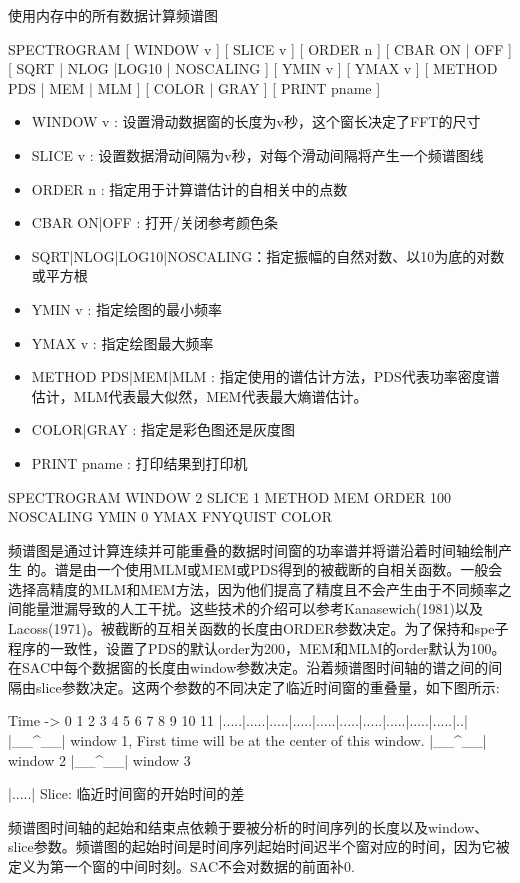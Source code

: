 \label{cmd:spectrogram}

使用内存中的所有数据计算频谱图

SPECTROGRAM [ WINDOW v ] [ SLICE v ] [ ORDER n ] [ CBAR ON | OFF ] [ SQRT | NLOG |LOG10 | NOSCALING ] [ YMIN v ] [ YMAX v ] [ METHOD PDS | MEM | MLM ] [
COLOR | GRAY ] [ PRINT pname ]

\begin{itemize}
\item WINDOW v : 设置滑动数据窗的长度为v秒，这个窗长决定了FFT的尺寸 
\item SLICE v : 设置数据滑动间隔为v秒，对每个滑动间隔将产生一个频谱图线 
\item ORDER n : 指定用于计算谱估计的自相关中的点数 
\item CBAR ON|OFF : 打开/关闭参考颜色条 
\item SQRT|NLOG|LOG10|NOSCALING：指定振幅的自然对数、以10为底的对数或平方根
\item YMIN v : 指定绘图的最小频率  
\item YMAX v : 指定绘图最大频率 
\item METHOD PDS|MEM|MLM : 指定使用的谱估计方法，PDS代表功率密度谱估计，MLM代表最大似然，MEM代表最大熵谱估计。  
\item COLOR|GRAY : 指定是彩色图还是灰度图 
\item PRINT pname : 打印结果到打印机  
\end{itemize}

SPECTROGRAM WINDOW 2 SLICE 1 METHOD MEM ORDER 100 NOSCALING 	YMIN 0 YMAX FNYQUIST COLOR

频谱图是通过计算连续并可能重叠的数据时间窗的功率谱并将谱沿着时间轴绘制产生	的。谱是由一个使用MLM或MEM或PDS得到的被截断的自相关函数。一般会选择高精度的MLM和MEM方法，因为他们提高了精度且不会产生由于不同频率之间能量泄漏导致的人工干扰。这些技术的介绍可以参考Kanasewich(1981)以及Lacoss(1971)。被截断的互相关函数的长度由ORDER参数决定。为了保持和spe子程序的一致性，设置了PDS的默认order为200，MEM和MLM的order默认为100。在SAC中每个数据窗的长度由window参数决定。沿着频谱图时间轴的谱之间的间隔由slice参数决定。这两个参数的不同决定了临近时间窗的重叠量，如下图所示:
\begin{SACCode}
Time ->
0  1  2  3  4  5  6  7  8  9 10 11
|.....|.....|.....|.....|.....|.....|.....|.....|.....|.....|..|
|__^__| window 1, First time will be at the center of this window.
      |__^__| window 2
            |__^__| window 3

|.....| Slice: 临近时间窗的开始时间的差
\end{SACCode}
频谱图时间轴的起始和结束点依赖于要被分析的时间序列的长度以及window、slice参数。频谱图的起始时间是时间序列起始时间迟半个窗对应的时间，因为它被定义为第一个窗的中间时刻。SAC不会对数据的前面补0.

